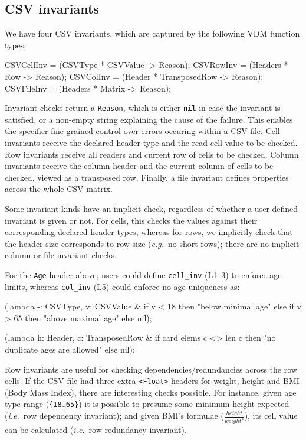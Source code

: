 \documentclass[runningheads,a4paper]{llncs}
\begin{document}
\subsection*{CSV invariants}\label{subsec:Invariants}

We have four CSV invariants, which are captured by the following VDM function types: 
%
\begin{vdmsl}[frame=none,basicstyle=\ttfamily\scriptsize]
    CSVCellInv = (CSVType * CSVValue -> Reason);
    CSVRowInv  = (Headers * Row -> Reason);
    CSVColInv  = (Header  * TransposedRow -> Reason);
    CSVFileInv = (Headers * Matrix -> Reason);
\end{vdmsl}
%
Invariant checks return a \texttt{Reason}, which is either \texttt{\textbf{nil}} in case the invariant is satisfied, or a non-empty string explaining the cause of the failure. This enables the specifier fine-grained control over errors occuring within a CSV file. Cell invariants receive the declared header type and the read cell value to be checked. Row invariants receive all readers and current row of cells to be checked. Column invariants receive the column header and the current column of cells to be checked, viewed as a transposed row. Finally, a file invariant defines properties across the whole CSV matrix.     

Some invariant kinds have an implicit check, regardless of whether a user-defined invariant is given or not. For cells, this checks the values against their corresponding declared header types, whereas for rows, we implicitly check that the header size corresponds to row size (\textit{e.g.}~no short rows); there are no implicit column or file invariant checks. 

For the \texttt{Age} header above, users could define \texttt{cell\_inv} (L1--3) to enforce age limits, whereas \texttt{col\_inv} (L5) could enforce no age uniqueness as:
%
\begin{vdmsl}[frame=none,basicstyle=\ttfamily\scriptsize,numbers=left,caption={Cell and Column Invariant Definitions},label={lst:CSVInvs}, numbers=none]
    (lambda -: CSVType, v: CSVValue & 
        if v < 18 then "below minimal age" else
        if v > 65 then "above maximal age" else nil);

    (lambda h: Header, c: TransposedRow & 
        if card elems c <> len c then "no duplicate ages are allowed" else nil);
\end{vdmsl}
%
Row invariants are useful for checking dependencies/redundancies across the row cells. If the CSV file had three extra \texttt{<Float>} headers for weight, height and BMI (Body Mass Index), there are interesting checks possible. For instance, given age type range (\texttt{\{18\ldots 65\}}) it is possible to presume some minimum height expected (\textit{i.e.}~row dependency invariant); and given BMI's formulae (\(\frac{height}{weight^2}\)), its cell value can be calculated (\textit{i.e.}~row redundancy invariant).    
\end{document}
